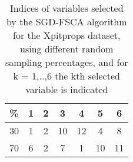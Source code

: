 \begin{table}
	\begin{center}
		\begin{tabular}{c c c c c c c}
			\% & 1 & 2 & 3 & 4 & 5 & 6 \\
			\hline
			30 & 1 & 2 & 10 & 12 & 4 & 8 \\
			70 & 6 & 2 & 7 & 1 & 10 & 11 \\
		\end{tabular}
	\end{center}
	\caption{Indices of variables selected by the SGD-FSCA algorithm for the Xpitprops dataset, using different random sampling percentages, and for k = 1,..,6 the kth selected variable is indicated}
\end{table}